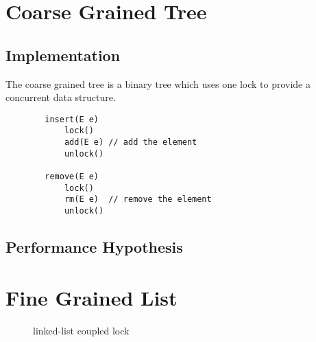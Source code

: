 \documentclass[10pt,a4paper]{article}
\begin{document}
\section{Coarse Grained Tree}
\subsection{Implementation}

The coarse grained tree is a binary tree which uses one lock to provide a concurrent data structure.

    \begin{lstlisting}
        insert(E e) 
            lock()
            add(E e) // add the element
            unlock()

        remove(E e)
            lock()
            rm(E e)  // remove the element
            unlock()
    \end{lstlisting}

\subsection{Performance Hypothesis}

\section{Fine Grained List}
\begin{figure}[h]
\centerline{
}
\caption{linked-list coupled lock}
\end{figure}
\end{document}
